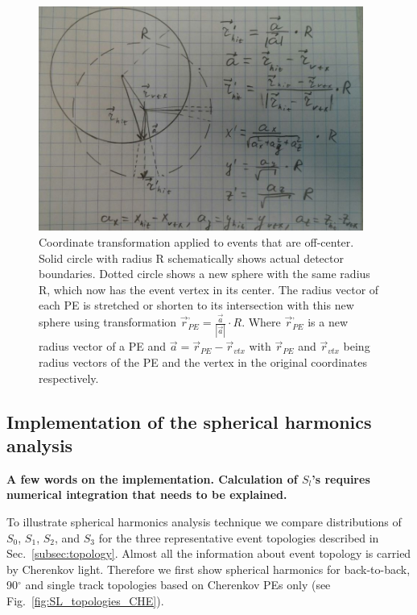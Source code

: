 \documentclass[12pt,twoside,letterpaper]{article}
\begin{document}
\begin{figure}[htb]
\centering
\includegraphics[angle=0,width=0.95\textwidth]{plots/SphH_transform_sketch.JPG}
\caption{Coordinate transformation applied to events that are off-center. Solid circle with radius R schematically shows actual detector boundaries. Dotted circle shows a new sphere with the same radius R, which now has the event vertex in its center. The radius vector of each PE is stretched or shorten to its intersection with this new sphere using transformation $\vec{r}^{,}_{PE} = \frac{\vec{a}}{|\vec{a}|} \cdot R$. Where $\vec{r}^{,}_{PE}$ is a new radius vector of a PE and $\vec{a}=\vec{r}_{PE} - \vec{r}_{vtx}$ with $\vec{r}_{PE}$ and $\vec{r}_{vtx}$ being radius vectors of the PE and the vertex in the original coordinates respectively.}
\label{fig:SphH_transform}
\end{figure}


\subsection{Implementation of the spherical harmonics analysis}
{\bf A few words on the implementation. Calculation of $S_l$'s requires numerical integration that needs to be explained.}

To illustrate spherical harmonics analysis technique we compare distributions of $S_0$, $S_1$, $S_2$, and $S_3$ for the three representative event topologies described in Sec.~\ref{subsec:topology}. Almost all the information about event topology is carried by Cherenkov light. Therefore we first show spherical harmonics for back-to-back,  90$^{\circ}$ and single track topologies based on Cherenkov PEs only (see Fig.~\ref{fig:SL_topologies_CHE}).
\end{document}
